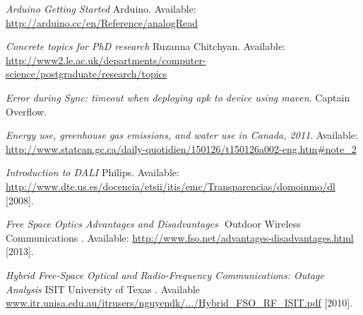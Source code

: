 \documentclass{article}
\begin{document}
\clearpage


\begin{thebibliography}{100} 

 \textit{Arduino Getting Started} Arduino. Available: \url{http://arduino.cc/en/Reference/analogRead}

 \textit{Concrete topics for PhD research} Ruzanna Chitchyan. Available: \url{http://www2.le.ac.uk/departments/computer-science/postgraduate/research/topics}

 \textit{Error during Sync: timeout when deploying apk to device using maven}. Captain Overflow. 

 \textit{Energy use, greenhouse gas emissions, and water use in Canada, 2011}. Available: \url{http://www.statcan.gc.ca/daily-quotidien/150126/t150126a002-eng.htm#note_2}

 \textit{Introduction to DALI} Philips. Available: \url{http://www.dte.us.es/docencia/etsii/itis/emc/Transparencias/domoinmo/dl} [2008].

\textit{Free Space Optics Advantages and Disadvantages } Outdoor Wireless Communications . Available: \url{http://www.fso.net/advantages-disadvantages.html} [2013].

\textit{Hybrid Free-Space Optical and Radio-Frequency
Communications: Outage Analysis} ISIT University of Texas . Available \url{www.itr.unisa.edu.au/itrusers/nguyendk/.../Hybrid_FSO_RF_ISIT.pdf‎} [2010].

\end{thebibliography}
\end{document}
